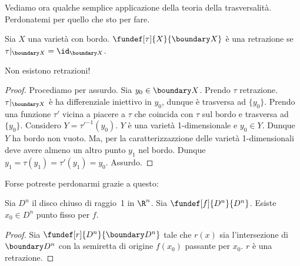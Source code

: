 Vediamo ora qualche semplice applicazione della teoria della trasversalità.
Perdonatemi per quello che sto per fare.

\begin{defn}[Retrazione]
Sia $X$ una varietà con bordo. $\fundef[\tau]{X}{\boundary X}$ è una retrazione se $\tau|_{\boundary X}=\id_{\boundary X}$.
\end{defn}

\begin{teo}
Non esistono retrazioni!
\end{teo}
\begin{proof}
Procediamo per assurdo. Sia $y_0 \in \boundary X$. Prendo $\tau$ retrazione. $\tau|_{\boundary X}$ è ha differenziale iniettivo in $y_0$,
dunque è trasversa ad $\{y_0\}$. Prendo una funzione $\tau'$ vicina a piacere a $\tau$ che coincida con $\tau$ sul bordo e trasversa ad $\{y_0\}$. Considero $Y=\tau'^{-1}(y_0)$. $Y$ è una varietà 1-dimensionale e $y_0\in Y$. Dunque $Y$ ha bordo non vuoto. Ma, per la caratterizzazzione delle varietà 1-dimensionali deve avere almeno un altro punto $y_1$ nel bordo. Dunque $y_1=\tau(y_1)=\tau'(y_1)=y_0$. Assurdo.  
\end{proof}
Forse potreste perdonarmi grazie a questo:
\begin{teo}
Sia $D^n$ il disco chiuso di raggio~1 in $\R^n$. Sia $\fundef[f]{D^n}{D^n}$. Esiste $x_0\in D^n$ punto fisso per $f$.
\end{teo}
\begin{proof}
Sia $\fundef[r]{D^n}{\boundary D^n}$ tale che $r(x)$ sia l'intersezione di $\boundary D^n$ con la semiretta di origine $f(x_0)$ passante per $x_0$. $r$ è una retrazione. 
\end{proof}

\begin{center}
\end{center}




